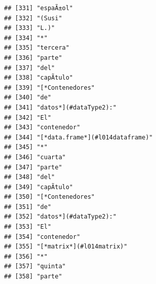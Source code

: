 \documentclass[
]{book}
\begin{document}
\begin{verbatim}
## [331] "espaÃ±ol"                                                                         
## [332] "(Susi"                                                                            
## [333] "L.)"                                                                              
## [334] "*"                                                                                
## [335] "tercera"                                                                          
## [336] "parte"                                                                            
## [337] "del"                                                                              
## [338] "capÃ­tulo"                                                                        
## [339] "[*Contenedores"                                                                   
## [340] "de"                                                                               
## [341] "datos*](#dataType2):"                                                             
## [342] "El"                                                                               
## [343] "contenedor"                                                                       
## [344] "[*data.frame*](#l014dataframe)"                                                   
## [345] "*"                                                                                
## [346] "cuarta"                                                                           
## [347] "parte"                                                                            
## [348] "del"                                                                              
## [349] "capÃ­tulo"                                                                        
## [350] "[*Contenedores"                                                                   
## [351] "de"                                                                               
## [352] "datos*](#dataType2):"                                                             
## [353] "El"                                                                               
## [354] "contenedor"                                                                       
## [355] "[*matrix*](#l014matrix)"                                                          
## [356] "*"                                                                                
## [357] "quinta"                                                                           
## [358] "parte"                                                                            

\end{verbatim}
\end{document}
